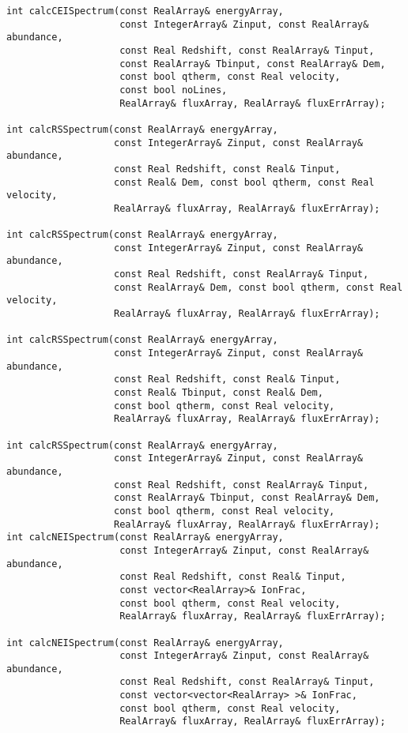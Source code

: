 \documentclass[11pt]{book}
\begin{document}
\begin{verbatim}
int calcCEISpectrum(const RealArray& energyArray, 
                    const IntegerArray& Zinput, const RealArray& abundance,
                    const Real Redshift, const RealArray& Tinput,
                    const RealArray& Tbinput, const RealArray& Dem, 
                    const bool qtherm, const Real velocity,
                    const bool noLines,
                    RealArray& fluxArray, RealArray& fluxErrArray);

int calcRSSpectrum(const RealArray& energyArray, 
                   const IntegerArray& Zinput, const RealArray& abundance,
                   const Real Redshift, const Real& Tinput,
                   const Real& Dem, const bool qtherm, const Real velocity,
                   RealArray& fluxArray, RealArray& fluxErrArray);

int calcRSSpectrum(const RealArray& energyArray, 
                   const IntegerArray& Zinput, const RealArray& abundance,
                   const Real Redshift, const RealArray& Tinput,
                   const RealArray& Dem, const bool qtherm, const Real velocity,
                   RealArray& fluxArray, RealArray& fluxErrArray);

int calcRSSpectrum(const RealArray& energyArray, 
                   const IntegerArray& Zinput, const RealArray& abundance,
                   const Real Redshift, const Real& Tinput,
                   const Real& Tbinput, const Real& Dem, 
                   const bool qtherm, const Real velocity,
                   RealArray& fluxArray, RealArray& fluxErrArray);

int calcRSSpectrum(const RealArray& energyArray, 
                   const IntegerArray& Zinput, const RealArray& abundance,
                   const Real Redshift, const RealArray& Tinput,
                   const RealArray& Tbinput, const RealArray& Dem, 
                   const bool qtherm, const Real velocity,
                   RealArray& fluxArray, RealArray& fluxErrArray);
int calcNEISpectrum(const RealArray& energyArray, 
                    const IntegerArray& Zinput, const RealArray& abundance,
                    const Real Redshift, const Real& Tinput,
                    const vector<RealArray>& IonFrac, 
                    const bool qtherm, const Real velocity,
                    RealArray& fluxArray, RealArray& fluxErrArray);

int calcNEISpectrum(const RealArray& energyArray, 
                    const IntegerArray& Zinput, const RealArray& abundance,
                    const Real Redshift, const RealArray& Tinput,
                    const vector<vector<RealArray> >& IonFrac, 
                    const bool qtherm, const Real velocity,
                    RealArray& fluxArray, RealArray& fluxErrArray);


\end{verbatim}
\end{document}
